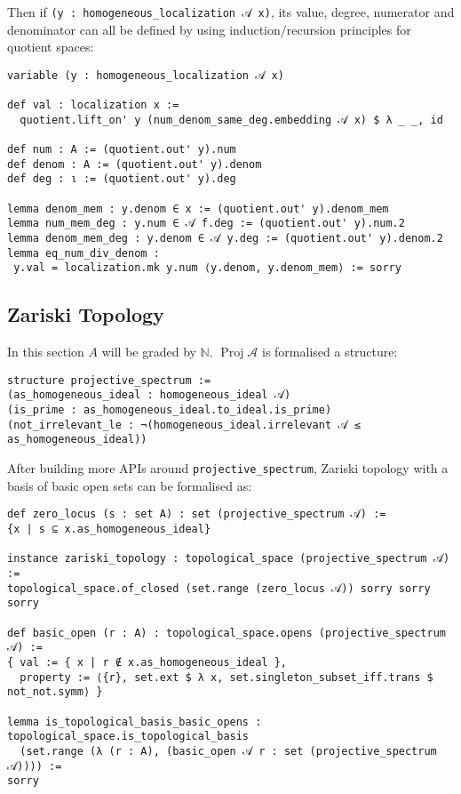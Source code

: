 \documentclass[a4paper,UKenglish,cleveref, autoref, thm-restate]{lipics-v2021}
\begin{document}
Then if \lstinline{(y : homogeneous_localization 𝒜 x)}, its value, degree, numerator and denominator can all be defined by using induction/recursion principles for quotient spaces:
\begin{lstlisting}
variable (y : homogeneous_localization 𝒜 x)
 
def val : localization x :=
  quotient.lift_on' y (num_denom_same_deg.embedding 𝒜 x) $ λ _ _, id

def num : A := (quotient.out' y).num
def denom : A := (quotient.out' y).denom
def deg : ι := (quotient.out' y).deg

lemma denom_mem : y.denom ∈ x := (quotient.out' y).denom_mem
lemma num_mem_deg : y.num ∈ 𝒜 f.deg := (quotient.out' y).num.2
lemma denom_mem_deg : y.denom ∈ 𝒜 y.deg := (quotient.out' y).denom.2
lemma eq_num_div_denom :
 y.val = localization.mk y.num ⟨y.denom, y.denom_mem⟩ := sorry
\end{lstlisting}

\subsection{Zariski Topology}
In this section $A$ will be graded by $\mathbb{N}$. $\operatorname{Proj}\mathcal{A}$ is formalised a structure:

\begin{lstlisting}
structure projective_spectrum :=
(as_homogeneous_ideal : homogeneous_ideal 𝒜)
(is_prime : as_homogeneous_ideal.to_ideal.is_prime)
(not_irrelevant_le : ¬(homogeneous_ideal.irrelevant 𝒜 ≤ as_homogeneous_ideal))
\end{lstlisting}

After building more APIs around \lstinline{projective_spectrum}, Zariski topology with a basis of basic open sets can be formalised as:
\begin{lstlisting}
def zero_locus (s : set A) : set (projective_spectrum 𝒜) :=
{x | s ⊆ x.as_homogeneous_ideal}

instance zariski_topology : topological_space (projective_spectrum 𝒜) :=
topological_space.of_closed (set.range (zero_locus 𝒜)) sorry sorry sorry

def basic_open (r : A) : topological_space.opens (projective_spectrum 𝒜) :=
{ val := { x | r ∉ x.as_homogeneous_ideal }, 
  property := ⟨{r}, set.ext $ λ x, set.singleton_subset_iff.trans $ not_not.symm⟩ }

lemma is_topological_basis_basic_opens : topological_space.is_topological_basis
  (set.range (λ (r : A), (basic_open 𝒜 r : set (projective_spectrum 𝒜)))) := 
sorry
\end{lstlisting}
\end{document}
